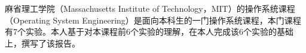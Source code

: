 

\begin{cnabstract}
  麻省理工学院（Massachusetts Institute of Technology，MIT）的操作系统课程\cite{mit6828}（Operating System Engineering）是面向本科生的一门操作系统课程，本门课程有7个实验。本人基于对本课程前6个实验的理解，在本人完成该6个实验的基础上，撰写了该报告。
\end{cnabstract}
\par
\vspace*{2em}


